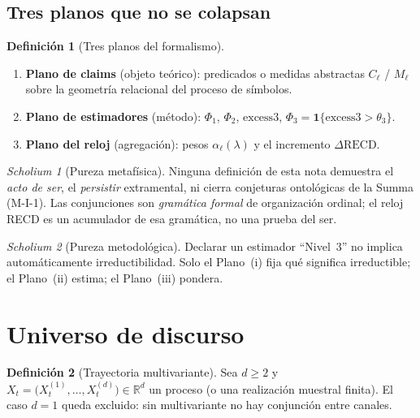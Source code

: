 \documentclass[11pt,a4paper]{article}
\theoremstyle{definition}
\newtheorem{definition}{Definici\'on}[section]
\theoremstyle{plain}
\theoremstyle{remark}
\newtheorem{scholium}{Scholium}[section]
\newcommand{\RECD}{\mathrm{RECD}}
\newcommand{\excess}{\mathrm{excess3}}
\begin{document}
\subsection{Tres planos que no se colapsan}
\label{sec:three_planes}

\begin{definition}[Tres planos del formalismo]
\label{def:planes}
\begin{enumerate}[label=(\roman*)]
  \item \textbf{Plano de claims} (objeto te\'orico): predicados o
  medidas abstractas $C_\ell$ / $M_\ell$ sobre la geometr\'ia relacional
  del proceso de s\'imbolos.
  \item \textbf{Plano de estimadores} (m\'etodo): $\Phi_1$, $\Phi_2$,
  $\excess$, $\Phi_3=\mathbf{1}\{\excess>\theta_3\}$.
  \item \textbf{Plano del reloj} (agregaci\'on): pesos
  $\alpha_\ell(\lambda)$ y el incremento $\Delta\RECD$.
\end{enumerate}
\end{definition}

\begin{scholium}[Pureza metaf\'isica]
Ninguna definici\'on de esta nota demuestra el \emph{acto de ser}, el
\emph{persistir} extramental, ni cierra conjeturas ontol\'ogicas de la
Summa (M-I-1). Las conjunciones son \emph{gram\'atica formal} de
organizaci\'on ordinal; el reloj RECD es un acumulador de esa gram\'atica,
no una prueba del ser.
\end{scholium}

\begin{scholium}[Pureza metodol\'ogica]
Declarar un estimador ``Nivel~3'' no implica autom\'aticamente
irreductibilidad. Solo el Plano~(i) fija qu\'e significa irreductible;
el Plano~(ii) estima; el Plano~(iii) pondera.
\end{scholium}

\section{Universo de discurso}
\label{sec:universe}

\begin{definition}[Trayectoria multivariante]
Sea $d\ge 2$ y $X_t=\bigl(X_t^{(1)},\ldots,X_t^{(d)}\bigr)\in\mathbb{R}^d$
un proceso (o una realizaci\'on muestral finita). El caso $d=1$ queda
excluido: sin multivariante no hay conjunci\'on entre canales.
\end{definition}
\end{document}
